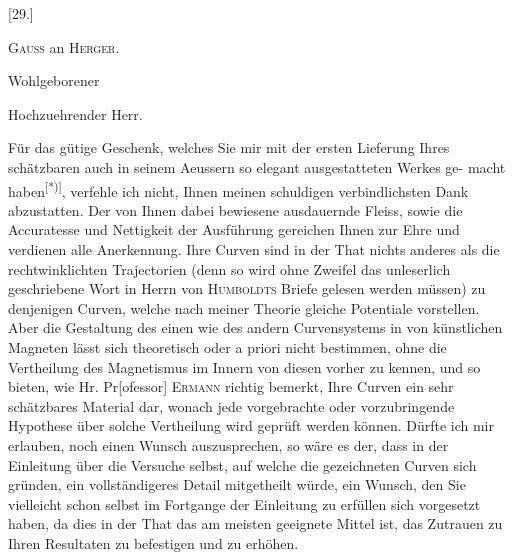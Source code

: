 \clearpage\begingroup{}
\begin{center}[29.]\end{center}
\begin{center}\textsc{Gauss} an \textsc{Herger}.\end{center}
\noindent\hspace*{.18\linewidth}Wohlgeborener\par
\noindent\hspace*{.25\linewidth}Hochzuehrender Herr.\par\medskip
\indent Für das gütige Geschenk, welches Sie mir mit der ersten Lieferung Ihres
schätzbaren auch in seinem Aeussern so elegant ausgestatteten Werkes ge-
\clearpage{}
\noindent macht haben\textsuperscript{[*)]}, verfehle ich nicht, Ihnen meinen schuldigen verbindlichsten
Dank abzustatten. Der von Ihnen dabei bewiesene ausdauernde Fleiss, sowie
die Accuratesse und Nettigkeit der Ausführung gereichen Ihnen zur Ehre und
verdienen alle Anerkennung. Ihre Curven sind in der That nichts anderes
als die rechtwinklichten Trajectorien (denn so wird ohne Zweifel das unleserlich
geschriebene Wort in Herrn von \textsc{Humboldts} Briefe gelesen werden müssen)
zu denjenigen Curven, welche nach meiner Theorie gleiche Potentiale vorstellen.
Aber die Gestaltung des einen wie des andern Curvensystems in
 von künstlichen Magneten lässt sich theoretisch oder a priori nicht
bestimmen, ohne die Vertheilung des Magnetismus im Innern von diesen vorher
zu kennen, und so bieten, wie Hr. Pr[ofessor] \textsc{Ermann} richtig bemerkt, Ihre
Curven ein sehr schätzbares Material dar, wonach jede vorgebrachte oder vorzubringende
Hypothese über solche Vertheilung wird geprüft werden können.
Dürfte ich mir erlauben, noch einen Wunsch auszusprechen, so wäre es der,
dass in der Einleitung über die Versuche selbst, auf welche die gezeichneten
Curven sich gründen, ein vollständigeres Detail mitgetheilt würde, ein Wunsch,
den Sie vielleicht schon selbst im Fortgange der Einleitung zu erfüllen sich
vorgesetzt haben, da dies in der That das am meisten geeignete Mittel ist,
das Zutrauen zu Ihren Resultaten zu befestigen und zu erhöhen.


